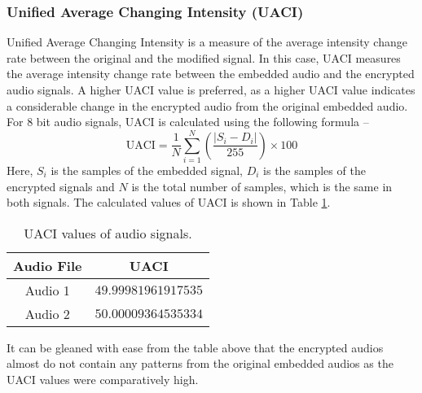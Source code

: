 \documentclass{article}
\begin{document}
\subsubsection{Unified Average Changing Intensity (UACI)}
Unified Average Changing Intensity is a measure of the average intensity change rate between the original and the modified signal. In this case, UACI measures the average intensity change rate between the embedded audio and the encrypted audio signals. A higher UACI value is preferred, as a higher UACI value indicates a considerable change in the encrypted audio from the original embedded audio. For 8 bit audio signals, UACI is calculated using the following formula --
\begin{equation}
    \text{UACI}=\frac{1}{N}\sum_{i=1}^{N}\left(\frac{|S_i-D_i|}{255}\right)\times100
\end{equation}
Here, $S_i$ is the samples of the embedded signal, $D_i$ is the samples of the encrypted signals and $N$ is the total number of samples, which is the same in both signals. The calculated values of UACI is shown in Table \ref{table:uaci}.
\begin{table}[!h]
    \begin{center}
        \caption{UACI values of audio signals.}
        \begin{tabular}{cc}
            \hline
            Audio File & UACI                \\ \hline
            Audio 1    & $49.99981961917535$ \\ \hdashline
            Audio 2    & $50.00009364535334$ \\ \hline
        \end{tabular}
        \label{table:uaci}
    \end{center}
\end{table}

It can be gleaned with ease from the table above that the encrypted audios almost do not contain any patterns from the original embedded audios as the UACI values were comparatively high.
\end{document}
